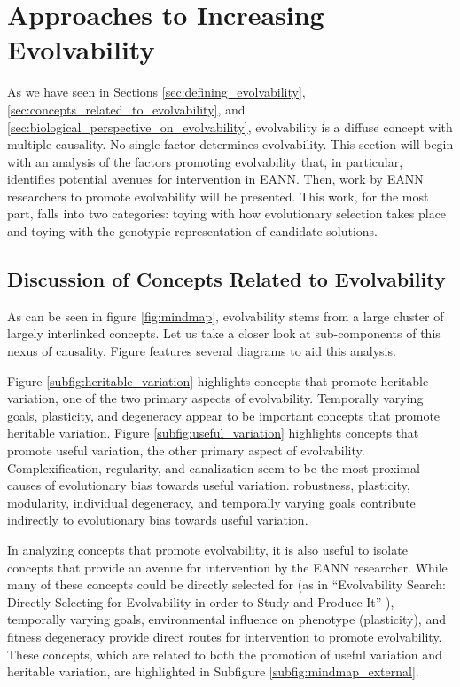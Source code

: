 \section{Approaches to Increasing Evolvability} \label{subsec:approaches_to_promoting_evolvability.tex}

As we have seen in Sections \ref{sec:defining_evolvability}, \ref{sec:concepts_related_to_evolvability}, and \ref{sec:biological_perspective_on_evolvability}, evolvability is a diffuse concept with multiple causality. No single factor determines evolvability. This section will begin with an analysis of the factors promoting evolvability that, in particular, identifies potential avenues for intervention in EANN. Then, work by EANN researchers to promote evolvability will be presented. This work, for the most part, falls into two categories: toying with how evolutionary selection takes place and toying with the genotypic representation of candidate solutions.

\subsection{Discussion of Concepts Related to Evolvability}
As can be seen in figure \ref{fig:mindmap}, evolvability stems from a large cluster of largely interlinked concepts. Let us take a closer look at sub-components of this nexus of causality. Figure  features several diagrams to aid this analysis. 

Figure \ref{subfig:heritable_variation} highlights concepts that promote heritable variation, one of the two primary aspects of evolvability. Temporally varying goals, plasticity, and degeneracy appear to be important concepts that promote heritable variation. Figure \ref{subfig:useful_variation} highlights concepts that promote useful variation, the other primary aspect of evolvability. Complexification, regularity, and canalization seem to be the most proximal causes of evolutionary bias towards useful variation. robustness, plasticity, modularity, individual degeneracy, and temporally varying goals contribute indirectly to evolutionary bias towards useful variation.

In analyzing concepts that promote evolvability, it is also useful to isolate concepts that provide an avenue for intervention by the EANN researcher. While many of these concepts could be directly selected for (as in ``Evolvability Search: Directly Selecting for Evolvability in order to Study and Produce It'' \cite{Mengistu2016EvolvabilityIt}), temporally varying goals, environmental influence on phenotype (plasticity), and fitness degeneracy provide direct routes for intervention to promote evolvability. These concepts, which are related to both the promotion of useful variation and heritable variation, are highlighted in Subfigure \ref{subfig:mindmap_external}.

